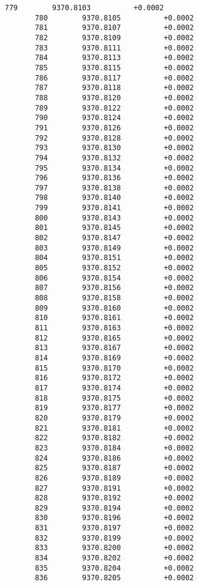 \documentclass[11pt]{article}
\begin{document}
\begin{Verbatim}[commandchars=\\\{\}]
       779        9370.8103          +0.0002
       780        9370.8105          +0.0002
       781        9370.8107          +0.0002
       782        9370.8109          +0.0002
       783        9370.8111          +0.0002
       784        9370.8113          +0.0002
       785        9370.8115          +0.0002
       786        9370.8117          +0.0002
       787        9370.8118          +0.0002
       788        9370.8120          +0.0002
       789        9370.8122          +0.0002
       790        9370.8124          +0.0002
       791        9370.8126          +0.0002
       792        9370.8128          +0.0002
       793        9370.8130          +0.0002
       794        9370.8132          +0.0002
       795        9370.8134          +0.0002
       796        9370.8136          +0.0002
       797        9370.8138          +0.0002
       798        9370.8140          +0.0002
       799        9370.8141          +0.0002
       800        9370.8143          +0.0002
       801        9370.8145          +0.0002
       802        9370.8147          +0.0002
       803        9370.8149          +0.0002
       804        9370.8151          +0.0002
       805        9370.8152          +0.0002
       806        9370.8154          +0.0002
       807        9370.8156          +0.0002
       808        9370.8158          +0.0002
       809        9370.8160          +0.0002
       810        9370.8161          +0.0002
       811        9370.8163          +0.0002
       812        9370.8165          +0.0002
       813        9370.8167          +0.0002
       814        9370.8169          +0.0002
       815        9370.8170          +0.0002
       816        9370.8172          +0.0002
       817        9370.8174          +0.0002
       818        9370.8175          +0.0002
       819        9370.8177          +0.0002
       820        9370.8179          +0.0002
       821        9370.8181          +0.0002
       822        9370.8182          +0.0002
       823        9370.8184          +0.0002
       824        9370.8186          +0.0002
       825        9370.8187          +0.0002
       826        9370.8189          +0.0002
       827        9370.8191          +0.0002
       828        9370.8192          +0.0002
       829        9370.8194          +0.0002
       830        9370.8196          +0.0002
       831        9370.8197          +0.0002
       832        9370.8199          +0.0002
       833        9370.8200          +0.0002
       834        9370.8202          +0.0002
       835        9370.8204          +0.0002
       836        9370.8205          +0.0002

\end{Verbatim}
\end{document}
